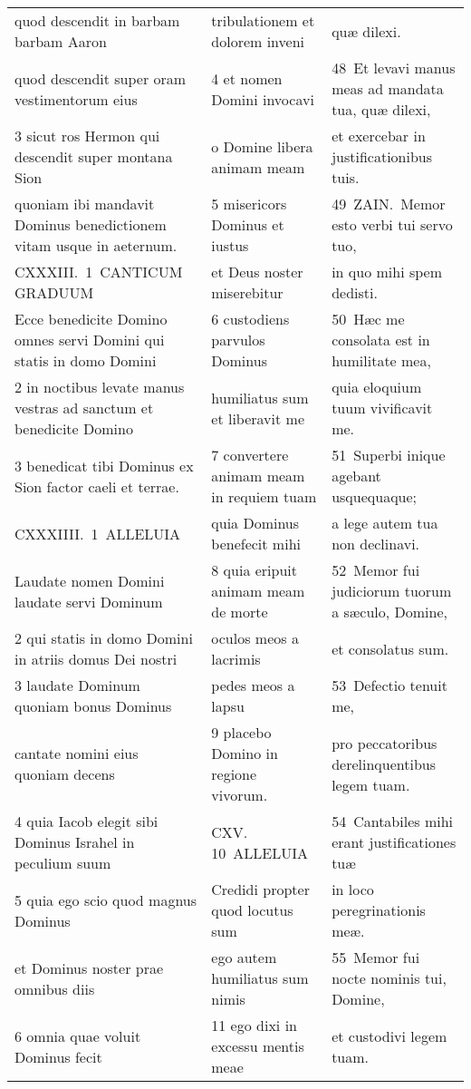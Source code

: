 \documentclass{article}
\begin{document}
\begin{longtable}{@{}p{}p{}p{}@{}}
quod descendit in barbam barbam Aaron	&	tribulationem et dolorem inveni	&	quæ dilexi.	\\
quod descendit super oram vestimentorum eius	&	4 et nomen Domini invocavi	&	48 Et levavi manus meas ad mandata tua, quæ dilexi,	\\
3 sicut ros Hermon qui descendit super montana Sion	&	o Domine libera animam meam	&	et exercebar in justificationibus tuis.	\\
quoniam ibi mandavit Dominus benedictionem vitam usque in aeternum.	&	5 misericors Dominus et iustus	&	49 ZAIN. Memor esto verbi tui servo tuo,	\\
CXXXIII. 1 CANTICUM GRADUUM	&	et Deus noster miserebitur	&	in quo mihi spem dedisti.	\\
Ecce benedicite Domino omnes servi Domini qui statis in domo Domini	&	6 custodiens parvulos Dominus	&	50 Hæc me consolata est in humilitate mea,	\\
2 in noctibus levate manus vestras ad sanctum et benedicite Domino	&	humiliatus sum et liberavit me	&	quia eloquium tuum vivificavit me.	\\
3 benedicat tibi Dominus ex Sion factor caeli et terrae.	&	7 convertere animam meam in requiem tuam	&	51 Superbi inique agebant usquequaque;	\\
CXXXIIII. 1 ALLELUIA	&	quia Dominus benefecit mihi	&	a lege autem tua non declinavi.	\\
Laudate nomen Domini laudate servi Dominum	&	8 quia eripuit animam meam de morte	&	52 Memor fui judiciorum tuorum a sæculo, Domine,	\\
2 qui statis in domo Domini in atriis domus Dei nostri	&	oculos meos a lacrimis	&	et consolatus sum.	\\
3 laudate Dominum quoniam bonus Dominus	&	pedes meos a lapsu	&	53 Defectio tenuit me,	\\
cantate nomini eius quoniam decens	&	9 placebo Domino in regione vivorum.	&	pro peccatoribus derelinquentibus legem tuam.	\\
4 quia Iacob elegit sibi Dominus Israhel in peculium suum	&	CXV. 10 ALLELUIA	&	54 Cantabiles mihi erant justificationes tuæ	\\
5 quia ego scio quod magnus Dominus	&	Credidi propter quod locutus sum	&	in loco peregrinationis meæ.	\\
et Dominus noster prae omnibus diis	&	ego autem humiliatus sum nimis	&	55 Memor fui nocte nominis tui, Domine,	\\
6 omnia quae voluit Dominus fecit	&	11 ego dixi in excessu mentis meae	&	et custodivi legem tuam.	\\

\end{longtable}
\end{document}

